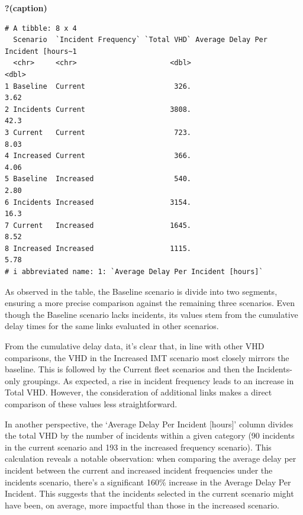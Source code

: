 \documentclass[
  letterpaper,
  authoryear]{elsarticle}
\begin{document}
\begin{table}

\caption{\textbf{?(caption)}}\begin{minipage}[t]{\linewidth}

{\centering 

\begin{verbatim}
# A tibble: 8 x 4
  Scenario  `Incident Frequency` `Total VHD` Average Delay Per Incident [hours~1
  <chr>     <chr>                      <dbl>                               <dbl>
1 Baseline  Current                     326.                                3.62
2 Incidents Current                    3808.                               42.3 
3 Current   Current                     723.                                8.03
4 Increased Current                     366.                                4.06
5 Baseline  Increased                   540.                                2.80
6 Incidents Increased                  3154.                               16.3 
7 Current   Increased                  1645.                                8.52
8 Increased Increased                  1115.                                5.78
# i abbreviated name: 1: `Average Delay Per Incident [hours]`
\end{verbatim}

}

\end{minipage}%

\end{table}

As observed in the table, the Baseline scenario is divide into two
segments, ensuring a more precise comparison against the remaining three
scenarios. Even though the Baseline scenario lacks incidents, its values
stem from the cumulative delay times for the same links evaluated in
other scenarios.

From the cumulative delay data, it's clear that, in line with other VHD
comparisons, the VHD in the Increased IMT scenario most closely mirrors
the baseline. This is followed by the Current fleet scenarios and then
the Incidents-only groupings. As expected, a rise in incident frequency
leads to an increase in Total VHD. However, the consideration of
additional links makes a direct comparison of these values less
straightforward.

In another perspective, the `Average Delay Per Incident {[}hours{]}'
column divides the total VHD by the number of incidents within a given
category (90 incidents in the current scenario and 193 in the increased
frequency scenario). This calculation reveals a notable observation:
when comparing the average delay per incident between the current and
increased incident frequencies under the incidents scenario, there's a
significant 160\% increase in the Average Delay Per Incident. This
suggests that the incidents selected in the current scenario might have
been, on average, more impactful than those in the increased scenario.
\end{document}
